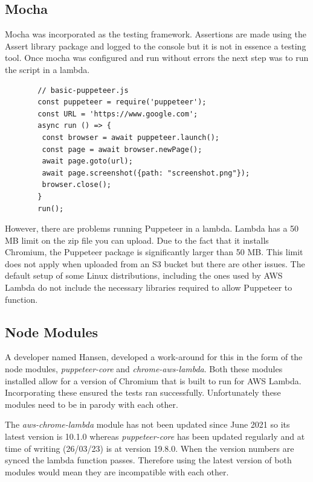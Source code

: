 \documentclass[12pt,a4paper,titlepage]{report}
\begin{document}
\subsection{Mocha}

Mocha was incorporated as the testing framework. Assertions are made using the Assert library package and logged to the console but it is not in essence a testing tool.
Once mocha was configured and run without errors the next step was to run the script in a lambda.

\begin{figure}[H]
 \begin{tcolorbox}
  \begin{verbatim}
  // basic-puppeteer.js
  const puppeteer = require('puppeteer');
  const URL = 'https://www.google.com';
  async run () => {
   const browser = await puppeteer.launch();
   const page = await browser.newPage();
   await page.goto(url);
   await page.screenshot({path: "screenshot.png"});
   browser.close();
  }
  run();
\end{verbatim}
\end{tcolorbox}
\end{figure}
However, there are problems running Puppeteer in a lambda. Lambda has a 50 MB limit on the zip file you can upload. 
Due to the fact that it installs Chromium, the Puppeteer package is significantly larger than 50 {MB}. This 
limit does not apply when uploaded from an S3 bucket but there are other issues. 
The default setup of some Linux distributions, including the ones used by AWS Lambda do not include the necessary libraries required to allow Puppeteer to function.

\subsection{Node Modules}

A developer named Hansen\autocite{Hansen}, developed a work-around for this in the form of the node modules, \textit{puppeteer-core} and \textit{chrome-aws-lambda}.
Both these modules installed allow for a version of Chromium that is built to run for AWS Lambda. Incorporating
these ensured the tests ran successfully. Unfortunately these modules need to be in parody with each other.

The \textit{aws-chrome-lambda} module has not been updated since June 2021 so its latest version is 10.1.0 whereas
\textit{puppeteer-core} has been updated regularly and at time of writing (26/03/23) is at version 19.8.0. When the version numbers are
synced the lambda function passes. Therefore using the latest version of both modules would mean they are incompatible with each other.
\end{document}
